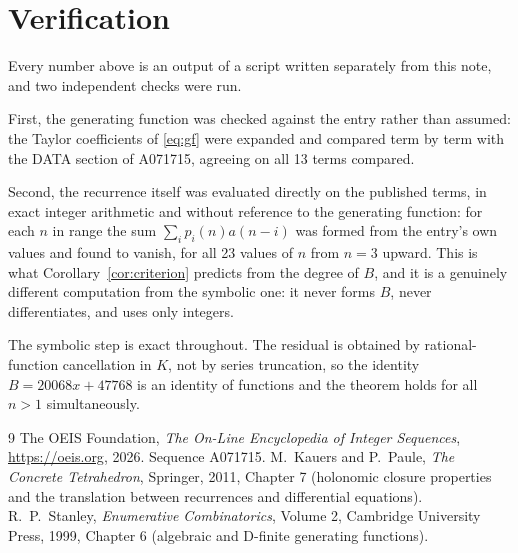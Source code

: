 \documentclass[11pt,a4paper]{article}
\theoremstyle{plain}
\theoremstyle{definition}
\begin{document}
\section{Verification}

Every number above is an output of a script written separately from this note, and two
independent checks were run.

First, the generating function was checked against the entry rather than assumed: the
Taylor coefficients of \eqref{eq:gf} were expanded and compared term by term with the DATA
section of A071715, agreeing on all 13 terms compared.

Second, the recurrence itself was evaluated directly on the published terms, in exact
integer arithmetic and without reference to the generating function: for each $n$ in range
the sum $\sum_{i}p_{i}(n)a(n-i)$ was formed from the entry's own values and found to
vanish, for all 23 values of $n$ from $n=3$ upward. This is what
Corollary~\ref{cor:criterion} predicts from the degree of $B$, and it is a genuinely
different computation from the symbolic one: it never forms $B$, never differentiates, and
uses only integers.

The symbolic step is exact throughout. The residual is obtained by rational-function
cancellation in $K$, not by series truncation, so the identity $B=20068 x + 47768$ is an
identity of functions and the theorem holds for all $n>1$ simultaneously.

\begin{thebibliography}{9}
 The OEIS Foundation, \emph{The On-Line Encyclopedia of Integer Sequences},
\url{https://oeis.org}, 2026. Sequence A071715.
 M.~Kauers and P.~Paule, \emph{The Concrete Tetrahedron}, Springer, 2011,
Chapter 7 (holonomic closure properties and the translation between recurrences and
differential equations).
 R.~P.~Stanley, \emph{Enumerative Combinatorics}, Volume 2, Cambridge
University Press, 1999, Chapter 6 (algebraic and D-finite generating functions).
\end{thebibliography}
\end{document}
